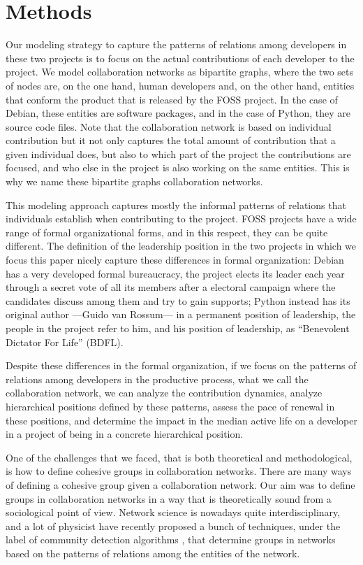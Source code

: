 \section{Methods}

Our modeling strategy to capture the patterns of relations among developers in these two projects is to focus on the actual contributions of each developer to the project. We model collaboration networks as bipartite graphs, where the two sets of nodes are, on the one hand, human developers and, on the other hand, entities that conform the product that is released by the FOSS project. In the case of Debian, these entities are software packages, and in the case of Python, they are source code files. Note that the collaboration network is based on individual contribution but it not only captures the total amount of contribution that a given individual does, but also to which part of the project the contributions are focused, and who else in the project is also working on the same entities. This is why we name these bipartite graphs collaboration networks.

This modeling approach captures mostly the informal patterns of relations that individuals establish when contributing to the project. FOSS projects have a wide range of formal organizational forms, and in this respect, they can be quite different. The definition of the leadership position in the two projects in which we focus this paper nicely capture these differences in formal organization: Debian has a very developed formal bureaucracy, the project elects its leader each year through a secret vote of all its members after a electoral campaign where the candidates discuss among them and try to gain supports; Python instead has its original author ---Guido van Rossum--- in a permanent position of leadership, the people in the project refer to him, and his position of leadership, as ``Benevolent Dictator For Life'' (BDFL).

Despite these differences in the formal organization, if we focus on the patterns of relations among developers in the productive process, what we call the collaboration network, we can analyze the contribution dynamics, analyze hierarchical positions defined by these patterns, assess the pace of renewal in these positions, and determine the impact in the median active life on a developer in a project of being in a concrete hierarchical position.

One of the challenges that we faced, that is both theoretical and methodological, is how to define cohesive groups in collaboration networks. There are many ways of defining a cohesive group given a collaboration network. Our aim was to define groups in collaboration networks in a way that is theoretically sound from a sociological point of view. Network science is nowadays quite interdisciplinary, and a lot of physicist have recently proposed a bunch of techniques, under the label of community detection algorithms \citep{fortunato:2010}, that determine groups in networks based on the patterns of relations among the entities of the network.

